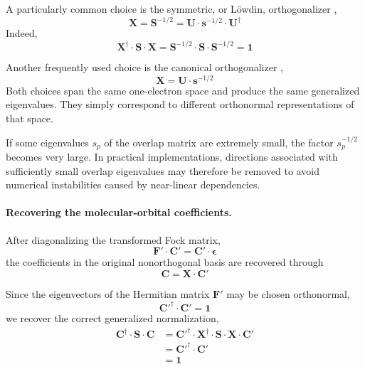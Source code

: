 \documentclass[11pt,a4paper,titlepage]{article}
\numberwithin{equation}{section}
\newcommand{\bs}{\boldsymbol{s}}
\newcommand{\bC}{\boldsymbol{C}}
\newcommand{\bF}{\boldsymbol{F}}
\newcommand{\bI}{\boldsymbol{1}}
\newcommand{\bS}{\boldsymbol{S}}
\newcommand{\bU}{\boldsymbol{U}}
\newcommand{\bX}{\boldsymbol{X}}
\newcommand{\beps}{\boldsymbol{\epsilon}}
\newcommand{\red}[1]{\textcolor{hfRed}{#1}}
\begin{document}
A particularly common choice is the
\red{symmetric, or L\"owdin, orthogonalizer} \citep{Lowdin1950},
\begin{equation}
  \boxed{
  \bX
  =
  \bS^{-1/2}
  =
  \bU\cdot\bs^{-1/2}\cdot\bU^\dag
  }
  \label{eq:lowdin-orthogonalizer}
\end{equation}
Indeed,
\begin{equation}
  \bX^\dag\cdot\bS\cdot\bX
  =
  \bS^{-1/2}\cdot
  \bS\cdot
  \bS^{-1/2}
  =
  \bI
\end{equation}

Another frequently used choice is the canonical orthogonalizer \citep{Lowdin1970},
\begin{equation}
  \bX
  =
  \bU\cdot\bs^{-1/2}
\end{equation}
Both choices span the same one-electron space and produce the same
generalized eigenvalues. They simply correspond to different orthonormal
representations of that space.

\hfBioLowdin

If some eigenvalues $s_p$ of the overlap matrix are extremely small, the
factor $s_p^{-1/2}$ becomes very large. In practical implementations,
directions associated with sufficiently small overlap eigenvalues may
therefore be removed to avoid numerical instabilities caused by near-linear
dependencies.


\paragraph{Recovering the molecular-orbital coefficients.}

After diagonalizing the transformed Fock matrix,
\begin{equation}
  \bF'\cdot\bC'
  =
  \bC'\cdot\beps
\end{equation}
the coefficients in the original nonorthogonal basis are recovered through
\begin{equation}
  \bC
  =
  \bX\cdot\bC'
\end{equation}

Since the eigenvectors of the Hermitian matrix $\bF'$ may be chosen
orthonormal,
\begin{equation}
  \bC'^\dag\cdot\bC'
  =
  \bI
\end{equation}
we recover the correct generalized normalization,
\begin{equation}
\begin{split}
  \bC^\dag\cdot\bS\cdot\bC
  &=
  \bC'^\dag\cdot
  \bX^\dag\cdot\bS\cdot\bX\cdot
  \bC'
  \\
  &=
  \bC'^\dag\cdot\bC'
  \\
  &=
  \bI
\end{split}
\end{equation}
\end{document}
